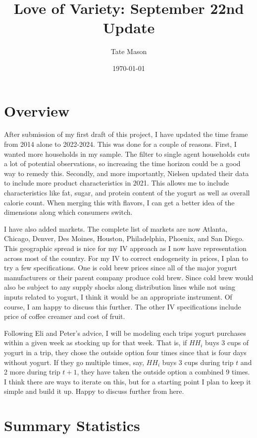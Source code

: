 \documentclass[11pt]{article}
\title{Love of Variety: September 22nd Update}
\author{Tate Mason}
\date{\today}
\theoremstyle{definition}
\theoremstyle{remark}
\begin{document}
\maketitle
\thispagestyle{empty}

\section{Overview}

After submission of my first draft of this project, I have updated the time frame from 2014 alone to 2022-2024. This was done for a couple of reasons. First, I wanted more households in my sample. The filter to single agent households cuts a lot of potential observations, so increasing the time horizon could be a good way to remedy this. Secondly, and more importantly, Nielsen updated their data to include more product characteristics in 2021. This allows me to include characteristics like fat, sugar, and protein content of the yogurt as well as overall calorie count. When merging this with flavors, I can get a better idea of the dimensions along which consumers switch.

I have also added markets. The complete list of markets are now Atlanta, Chicago, Denver, Des Moines, Houston, Philadelphia, Phoenix, and San Diego. This geographic spread is nice for my IV approach as I now have representation across most of the country. For my IV to correct endogeneity in prices, I plan to try a few specifications. One is cold brew prices since all of the major yogurt manufacturers or their parent company produce cold brew. Since cold brew would also be subject to any supply shocks along distribution lines while not using inputs related to yogurt, I think it would be an appropriate instrument. Of course, I am happy to discuss this further. The other IV specifications include price of coffee creamer and cost of fruit.

Following Eli and Peter's advice, I will be modeling each trips yogurt purchases within a given week as stocking up for that week. That is, if $HH_i$ buys 3 cups of yogurt in a trip, they chose the outside option four times since that is four days without yogurt. If they go multiple times, say, $HH_i$ buys 3 cups during trip $t$ and 2 more during trip $t+1$, they have taken the outside option a combined 9 times. I think there are ways to iterate on this, but for a starting point I plan to keep it simple and build it up. Happy to discuss further from here.

\section{Summary Statistics}
\end{document}
